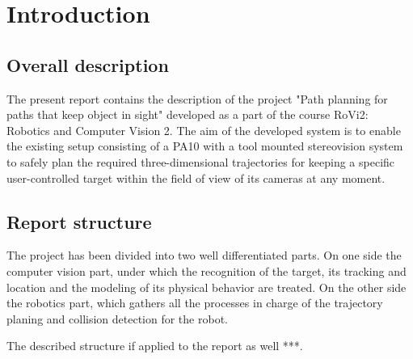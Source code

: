 
\chapter{Introduction}
\label{chap:introduction}

\section{Overall description}
\label{sec:overall_description}
The present report contains the description of the  project "Path planning for paths that keep
object in sight" developed as a part of the course RoVi2: Robotics and Computer Vision 2. 
The aim of the developed system is to enable the existing setup consisting of a PA10 with a tool mounted stereovision system to safely plan the required three-dimensional trajectories for keeping a specific user-controlled target within the field of view of its cameras at any moment. 

\section{Report structure}
\label{sec:report_structure}
The project has been divided into two well differentiated parts. On one side the computer vision part, under which the recognition of the target, its tracking and location and the modeling of its physical behavior are treated. On the other side the robotics part, which gathers all the processes in charge of the trajectory planing and collision detection for the robot.

The described structure if applied to the report as well ***.